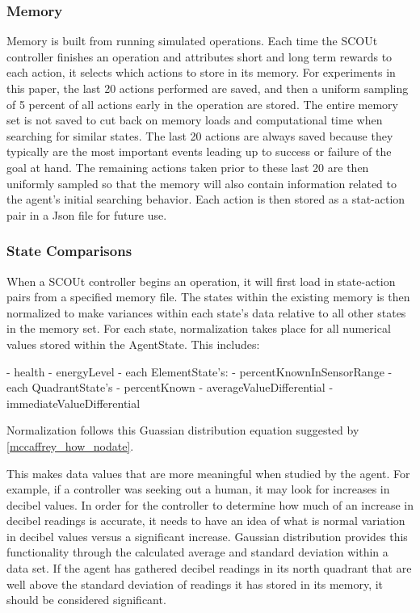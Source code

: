 \subsubsection{Memory}
Memory is built from running simulated operations.
Each time the SCOUt controller finishes an operation and attributes short and long term rewards to each action, it selects which actions to store in its memory.
For experiments in this paper, the last 20 actions performed are saved, and then a uniform sampling of 5 percent of all actions early in the operation are stored.
The entire memory set is not saved to cut back on memory loads and computational time when searching for similar states.
The last 20 actions are always saved because they typically are the most important events leading up to success or failure of the goal at hand.
The remaining actions taken prior to these last 20 are then uniformly sampled so that the memory will also contain information related to the agent's initial searching behavior.
Each action is then stored as a stat-action pair in a Json file for future use.


\subsubsection{State Comparisons}
When a SCOUt controller begins an operation, it will first load in state-action pairs from a specified memory file.
The states within the existing memory is then normalized to make variances within each state's data relative to all other states in the memory set.
For each state, normalization takes place for all numerical values stored within the AgentState.
This includes:

- health
- energyLevel
- each ElementState's:
  - percentKnownInSensorRange
  - each QuadrantState's
    - percentKnown
    - averageValueDifferential
    - immediateValueDifferential

Normalization follows this Guassian distribution equation suggested by \ref{mccaffrey_how_nodate}.


This makes data values that are more meaningful when studied by the agent.
For example, if a controller was seeking out a human, it may look for increases in decibel values.
In order for the controller to determine how much of an increase in decibel readings is accurate, it needs to have an idea of what is normal variation in decibel values versus a significant increase.
Gaussian distribution provides this functionality through the calculated average and standard deviation within a data set.
If the agent has gathered decibel readings in its north quadrant that are well above the standard deviation of readings it has stored in its memory, it should be considered significant.

